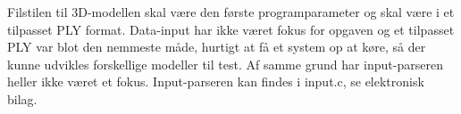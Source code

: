 Filstilen til 3D-modellen skal være den første programparameter og skal være i et tilpasset PLY format. Data-input har ikke været fokus for opgaven og et tilpasset PLY var blot den nemmeste måde, hurtigt at få et system op at køre, så der kunne udvikles forskellige modeller til test. Af samme grund har input-parseren heller ikke været et fokus. Input-parseren kan findes i input.c, se elektronisk bilag. 